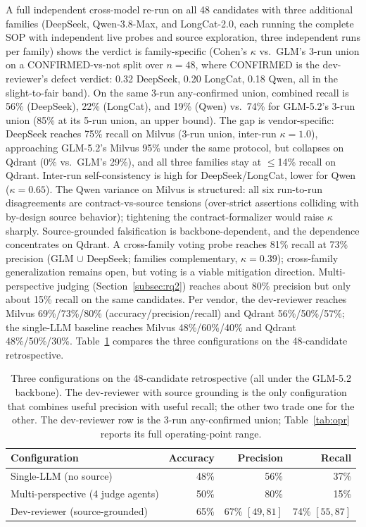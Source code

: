 \documentclass[sigconf]{acmart}
\begin{document}
A full independent cross-model re-run on all 48 candidates with three additional families (DeepSeek, Qwen-3.8-Max, and LongCat-2.0, each running the complete SOP with independent live probes and source exploration, three independent runs per family) shows the verdict is family-specific (Cohen's $\kappa$ vs.\ GLM's 3-run union on a CONFIRMED-vs-not split over $n{=}48$, where CONFIRMED is the dev-reviewer's defect verdict: 0.32 DeepSeek, 0.20 LongCat, 0.18 Qwen, all in the slight-to-fair band). On the same 3-run any-confirmed union, combined recall is 56\% (DeepSeek), 22\% (LongCat), and 19\% (Qwen) vs.\ 74\% for GLM-5.2's 3-run union (85\% at its 5-run union, an upper bound). The gap is vendor-specific: DeepSeek reaches 75\% recall on Milvus (3-run union, inter-run $\kappa = 1.0$), approaching GLM-5.2's Milvus 95\% under the same protocol, but collapses on Qdrant (0\% vs.\ GLM's 29\%), and all three families stay at $\leq$14\% recall on Qdrant. Inter-run self-consistency is high for DeepSeek/LongCat, lower for Qwen ($\kappa = 0.65$). The Qwen variance on Milvus is structured: all six run-to-run disagreements are contract-vs-source tensions (over-strict assertions colliding with by-design source behavior); tightening the contract-formalizer would raise $\kappa$ sharply. Source-grounded falsification is backbone-dependent, and the dependence concentrates on Qdrant. A cross-family voting probe reaches 81\% recall at 73\% precision (GLM $\cup$ DeepSeek; families complementary, $\kappa = 0.39$); cross-family generalization remains open, but voting is a viable mitigation direction. Multi-perspective judging (Section~\ref{subsec:rq2}) reaches about 80\% precision but only about 15\% recall on the same candidates. Per vendor, the dev-reviewer reaches Milvus 69\%/73\%/80\% (accuracy/precision/recall) and Qdrant 56\%/50\%/57\%; the single-LLM baseline reaches Milvus 48\%/60\%/40\% and Qdrant 48\%/50\%/30\%. Table~\ref{tab:configs} compares the three configurations on the 48-candidate retrospective.

\begin{table}[t]
\caption{Three configurations on the 48-candidate retrospective (all under the GLM-5.2 backbone). The dev-reviewer with source grounding is the only configuration that combines useful precision with useful recall; the other two trade one for the other. The dev-reviewer row is the 3-run any-confirmed union; Table~\ref{tab:opr} reports its full operating-point range.}
\label{tab:configs}
\small
\begin{tabular}{@{}lrrr@{}}
\toprule
Configuration & Accuracy & Precision & Recall \\
\midrule
Single-LLM (no source) & 48\% & 56\% & 37\% \\
Multi-perspective (4 judge agents) & 50\% & 80\% & 15\% \\
Dev-reviewer (source-grounded) & 65\% & 67\% $[49, 81]$ & 74\% $[55, 87]$ \\
\bottomrule
\end{tabular}
\end{table}
\end{document}
